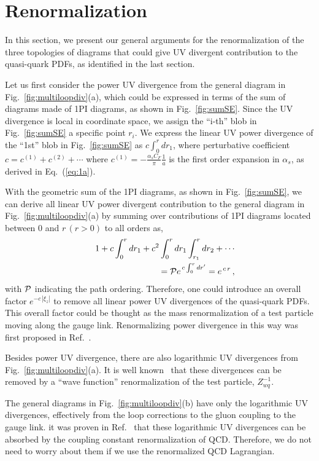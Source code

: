 \section{Renormalization}
\label{sec:renormalization}

In this section, we present our general arguments for the renormalization of the three topologies of diagrams that could give UV divergent contribution to the quasi-quark PDFs, as identified in the last section.

Let us first consider the power UV divergence from the general diagram in Fig.~\ref{fig:multiloopdiv}(a), which could be expressed in terms of the sum of diagrams made of 1PI diagrams, as shown in Fig.~\ref{fig:sumSE}.  Since the UV divergence is local in coordinate space, we assign the ``i-th'' blob in Fig.~\ref{fig:sumSE} a specific point $r_i$. We express the linear UV power divergence of the ``1st'' blob in Fig.~\ref{fig:sumSE} as $c \int_0^{r} d r_1$, where perturbative coefficient $c=c^{(1)}+c^{(2)}+\cdots$ where $c^{(1)}=-\frac{\alpha_s C_F}{\pi}\frac{1}{a} $ is the first order expansion in $\alpha_s$, as derived in Eq.~(\ref{eq:1a}).

With the geometric sum of the 1PI diagrams, as shown in Fig.~\ref{fig:sumSE}, we can derive all linear UV power divergent contribution to the general diagram in Fig.~\ref{fig:multiloopdiv}(a) by summing over contributions of 1PI diagrams located between 0 and $r\,(r>0)$ to all orders as,
\begin{eqnarray}
&\ & 1+ c \int_0^{r} d r_1 + c^2 \int_0^{r} d r_1 \int_{r_1}^{r} d r_2 + \cdots
\nonumber \\
&\ & \hskip 0.3in
= {\cal P} e^{\, c \int_0^r dr'} = e^{\, c\, r}\, ,
\end{eqnarray}
with ${\cal P}$ indicating the path ordering.
Therefore, one could introduce an overall factor $e^{-c\, |\xi_z|}$ to remove all linear power UV divergences of the quasi-quark PDFs. This overall factor could be thought as the mass renormalization of a test particle moving along the gauge link. Renormalizing power divergence in this way was first proposed in Ref.~\cite{Polyakov:1980ca}.

Besides power UV divergence, there are also logarithmic UV divergences from Fig.~\ref{fig:multiloopdiv}(a).  It is well known~\cite{Dotsenko:1979wb} that these divergences can be removed by a ``wave function'' renormalization of the test particle, $Z_{wq}^{-1}$.

The general diagrams in Fig.~\ref{fig:multiloopdiv}(b) have only the logarithmic UV divergences, effectively from the loop corrections to the gluon coupling to the gauge link.  it was proven in Ref.~\cite{Dotsenko:1979wb} that these logarithmic UV divergences can be absorbed by the coupling constant renormalization of QCD. Therefore, we do not need to worry about them if we use the renormalized QCD Lagrangian.

